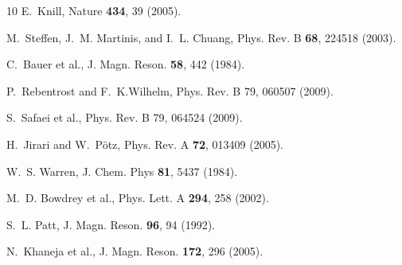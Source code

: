 \documentclass[prl,twocolumn,aps,final,floatfix,superscriptaddress,showpacs]{revtex4}
\begin{document}
\begin{thebibliography}{10}
E.~Knill, Nature \textbf{434}, 39 (2005).


M.~Steffen, J.~M. Martinis, and I.~L. Chuang, Phys. Rev. B \textbf{68}, 224518
  (2003).

C.~Bauer et al., J. Magn. Reson.
  \textbf{58}, 442 (1984).

P.~Rebentrost and F.~K.Wilhelm, Phys. Rev. B 79, 060507 (2009).

S.~Safaei et al., Phys. Rev. B 79, 064524 (2009).

 H.~Jirari and W.~P\"otz, Phys. Rev. A {\bf 72}, 013409 (2005).


W.~S. Warren, J. Chem. Phys \textbf{81}, 5437 (1984).

M.~D. Bowdrey et al., Phys.
  Lett. A \textbf{294}, 258 (2002).


S.~L. Patt, J. Magn. Reson. \textbf{96}, 94 (1992).

N.~Khaneja et al., J.
  Magn. Reson. \textbf{172}, 296 (2005).

\end{thebibliography}


% 
% 
\end{document}
